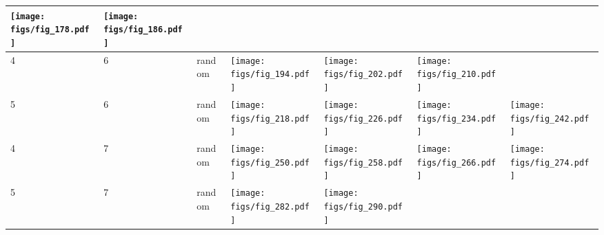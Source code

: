\documentclass[oneside,canadian,landscape]{article}
\begin{document}
\begin{center}
\begin{longtable}{|l|l|l||l|l|l|l|}
\begin{minipage}{3.5cm}
\texttt{[image: figs/fig\_178.pdf]}
\end{minipage}
&\begin{minipage}{3.5cm}
\texttt{[image: figs/fig\_186.pdf]}
\end{minipage}
&\\ \hline
4&6&random&\begin{minipage}{3.5cm}
\texttt{[image: figs/fig\_194.pdf]}
\end{minipage}
&\begin{minipage}{3.5cm}
\texttt{[image: figs/fig\_202.pdf]}
\end{minipage}
&\begin{minipage}{3.5cm}
\texttt{[image: figs/fig\_210.pdf]}
\end{minipage}
&\\ \hline
5&6&random&\begin{minipage}{3.5cm}
\texttt{[image: figs/fig\_218.pdf]}
\end{minipage}
&\begin{minipage}{3.5cm}
\texttt{[image: figs/fig\_226.pdf]}
\end{minipage}
&\begin{minipage}{3.5cm}
\texttt{[image: figs/fig\_234.pdf]}
\end{minipage}
&\begin{minipage}{3.5cm}
\texttt{[image: figs/fig\_242.pdf]}
\end{minipage}
\\ \hline
4&7&random&\begin{minipage}{3.5cm}
\texttt{[image: figs/fig\_250.pdf]}
\end{minipage}
&\begin{minipage}{3.5cm}
\texttt{[image: figs/fig\_258.pdf]}
\end{minipage}
&\begin{minipage}{3.5cm}
\texttt{[image: figs/fig\_266.pdf]}
\end{minipage}
&\begin{minipage}{3.5cm}
\texttt{[image: figs/fig\_274.pdf]}
\end{minipage}
\\ \hline
5&7&random&\begin{minipage}{3.5cm}
\texttt{[image: figs/fig\_282.pdf]}
\end{minipage}
&\begin{minipage}{3.5cm}
\texttt{[image: figs/fig\_290.pdf]}

\end{minipage}
\end{longtable}
\end{center}
\end{document}
